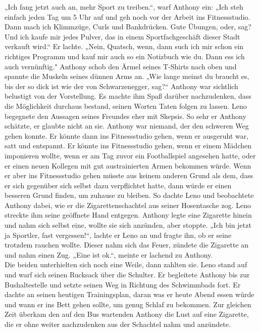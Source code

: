 \documentclass[ngerman,smalldemyvopaper,11pt,oneside,onecolumn,openright,extrafontsizes]{memoir}
\begin{document}
„Ich fang jetzt auch an, mehr Sport zu treiben.“, warf Anthony ein: „Ich steh einfach jeden Tag um 5 Uhr auf und geh noch vor der Arbeit ins Fitnessstudio. Dann mach ich Klimmzüge, Curls und Bankdrücken. Gute Übungen, oder, sag? Und ich kaufe mir jedes Pulver, das in einem Sportfachgeschäft dieser Stadt verkauft wird.“ Er lachte. „Nein, Quatsch, wenn, dann such ich mir schon ein richtiges Programm und kauf mir auch so ein Notizbuch wie du. Dann ess ich auch vernünftig." Anthony schob den Ärmel seines T-Shirts nach oben und spannte die Muskeln seines dünnen Arms an. „Wie lange meinst du braucht es, bis der so dick ist wie der von Schwarzenegger, sag?“ Anthony war sichtlich belustigt von der Vorstellung. Es machte ihm Spaß darüber nachzudenken, dass die Möglichkeit durchaus bestand, seinen Worten Taten folgen zu lassen. Leno begegnete den Aussagen seines Freundes eher mit Skepsis. So sehr er Anthony schätzte, er glaubte nicht an sie. Anthony war niemand, der den schweren Weg gehen konnte. Er könnte dann ins Fitnessstudio gehen, wenn er ausgeruht war, satt und entspannt. Er könnte ins Fitnessstudio gehen, wenn er einem Mädchen imponieren wollte, wenn er am Tag zuvor ein Footballspiel angesehen hatte, oder er einen neuen Kollegen mit gut austrainierten Armen bekommen würde. Wenn er aber ins Fitnessstudio gehen müsste aus keinem anderen Grund als dem, dass er sich gegenüber sich selbst dazu verpflichtet hatte, dann würde er einen besseren Grund finden, um zuhause zu bleiben. So dachte Leno und beobachtete Anthony dabei, wie er die Zigarettenschachtel aus seiner Hosentasche zog. Leno streckte ihm seine geöffnete Hand entgegen. Anthony legte eine Zigarette hinein und nahm sich selbst eine, wollte sie sich anzünden, aber stoppte. „Ich bin jetzt ja Sportler, fast vergessen!“, lachte er Leno an und fragte ihn, ob er seine trotzdem rauchen wollte. Dieser nahm sich das Feuer, zündete die Zigarette an und nahm einen Zug. „Eine ist ok.“, meinte er lachend zu Anthony.\\
Die beiden unterhielten sich noch eine Weile, dann zahlten sie. Leno stand auf und warf sich seinen Rucksack über die Schulter. Er begleitete Anthony bis zur Bushaltestelle und setzte seinen Weg in Richtung des Schwimmbads fort. Er dachte an seinen heutigen Trainingsplan, daran was er heute Abend essen würde und wann er ins Bett gehen sollte, um genug Schlaf zu bekommen. Zur gleichen Zeit überkam den auf den Bus wartenden Anthony die Lust auf eine Zigarette, die er ohne weiter nachzudenken aus der Schachtel nahm und anzündete.
\end{document}
